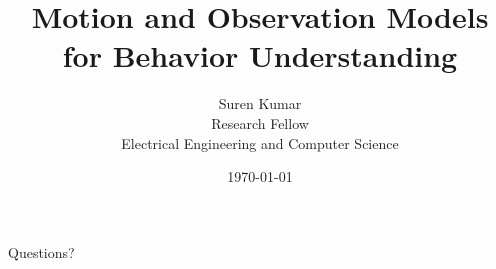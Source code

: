 \documentclass[10pt, compress]{beamer}
\title{Motion and Observation Models for Behavior Understanding}
\author{Suren Kumar \\ Research Fellow \\ Electrical Engineering and Computer
Science}
\institute{University of Michigan, Ann Arbor}
\date{\today}
\begin{document}
\maketitle
%
%

%
%

\begin{frame}[standout]
Questions?
\end{frame}
\end{document}
